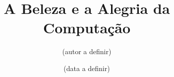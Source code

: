 \documentclass[12pt]{book}
\begin{document}
\frontmatter
\title{A Beleza e a Alegria da Computação}
\author{(autor a definir)}
\date{(data a definir)}
\maketitle
%
\tableofcontents

%

\mainmatter



%


%



\end{document}
